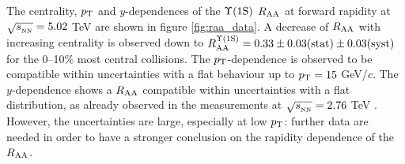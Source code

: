 The centrality, $p_{\rm T}$ and $y$-dependences of the $\mbox{$\Upsilon$(1S)}$ $\mbox{$R_{\rm{AA}}$}$ at forward rapidity at $\sqrt{s_{_{\rm NN}}}=5.02$ \rm{TeV} are shown in figure \ref{fig:raa_data}. 
A decrease of $\mbox{$R_{\rm{AA}}$}$ with increasing centrality is observed down to $R_{\rm{AA}}^{\Upsilon(\rm1S)}=0.33\pm0.03\text{(stat)}\pm0.03\text{(syst)}$  for the 0--10\% most central collisions.
The $p_{\rm T}$-dependence is observed to be compatible within uncertainties with a flat behaviour up to $p_{\rm T}=15$ GeV/$c$.
The $y$-dependence shows a $\mbox{$R_{\rm{AA}}$}$ compatible within uncertainties with a flat distribution, as already observed in the measurements at $\sqrt{s_{_{\rm NN}}}=2.76$ \rm{TeV} \cite{Abelev:2014nua}.
However, the uncertainties are large, especially at low $p_{\rm{T}}$: further data are needed in order to have a stronger conclusion on the rapidity dependence of the $\mbox{$R_{\rm{AA}}$}$.

